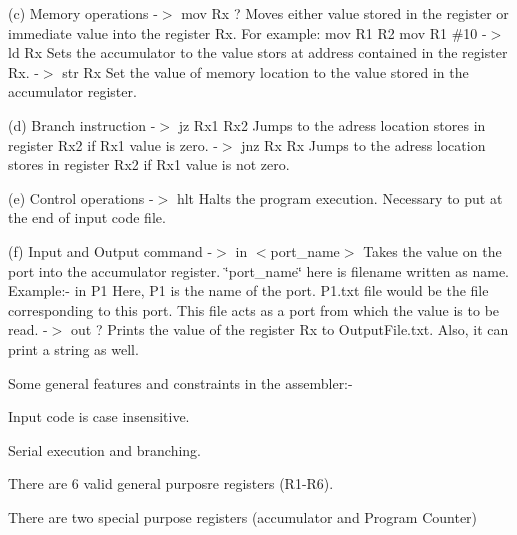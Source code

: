 (c) Memory operations -\/\texorpdfstring{$>$}{>} mov Rx ? Moves either value stored in the register or immediate value into the register Rx. For example\+: mov R1 R2 mov R1 \#10 -\/\texorpdfstring{$>$}{>} ld Rx Sets the accumulator to the value stors at address contained in the register Rx. -\/\texorpdfstring{$>$}{>} str Rx Set the value of memory location to the value stored in the accumulator register.

(d) Branch instruction -\/\texorpdfstring{$>$}{>} jz Rx1 Rx2 Jumps to the adress location stores in register Rx2 if Rx1 value is zero. -\/\texorpdfstring{$>$}{>} jnz Rx Rx Jumps to the adress location stores in register Rx2 if Rx1 value is not zero.

(e) Control operations -\/\texorpdfstring{$>$}{>} hlt Halts the program execution. Necessary to put at the end of input code file.

(f) Input and Output command -\/\texorpdfstring{$>$}{>} in $<$port\+\_\+name$>$ Takes the value on the port into the accumulator register. \char`\"{}port\+\_\+name\char`\"{} here is filename written as name. Example\+:-\/ in P1 Here, P1 is the name of the port. P1.\+txt file would be the file corresponding to this port. This file acts as a port from which the value is to be read. -\/\texorpdfstring{$>$}{>} out ? Prints the value of the register Rx to Output\+File.\+txt. Also, it can print a string as well.

Some general features and constraints in the assembler\+:-\/
\begin{DoxyEnumerate}
\item Input code is case insensitive.
\item Serial execution and branching.
\item There are 6 valid general purposre registers (R1-\/\+R6).
\item There are two special purpose registers (accumulator and Program Counter) 
\end{DoxyEnumerate}